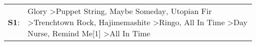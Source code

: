 \begin{supertabular}{p{0.03\textwidth}p{0.92\textwidth}}
 \textbf{S1}:  &  Glory\textsuperscript{} \textgreater \enspace Puppet String\textsuperscript{}, \enspace Maybe Someday\textsuperscript{}, \enspace Utopian Fir\textsuperscript{} \textgreater \enspace Trenchtown Rock\textsuperscript{}, \enspace Hajimemashite\textsuperscript{} \textgreater \enspace Ringo\textsuperscript{}, \enspace All In Time\textsuperscript{} \textgreater \enspace Day Nurse\textsuperscript{}, \enspace Remind Me[1]\textsuperscript{} \textgreater \enspace All In Time\textsuperscript{}  \enspace  \\
\end{supertabular}
